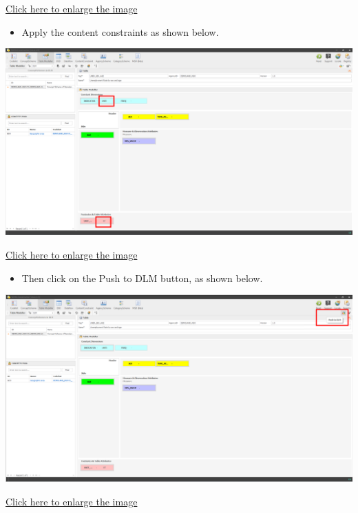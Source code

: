 \documentclass[
]{book}
\providecommand{\tightlist}{%
  \setlength{\itemsep}{0pt}\setlength{\parskip}{0pt}}
\begin{document}
\href{images/image220.png}{Click here to enlarge the image}

\begin{itemize}
\tightlist
\item
  Apply the content constraints as shown below.
\end{itemize}

\begin{center}\includegraphics[width=1\linewidth]{./images/image222} \end{center}

\href{images/image222.png}{Click here to enlarge the image}

\begin{itemize}
\tightlist
\item
  Then click on the Push to DLM button, as shown below.
\end{itemize}

\begin{center}\includegraphics[width=1\linewidth]{./images/image224} \end{center}

\href{images/image224.png}{Click here to enlarge the image}
\end{document}
